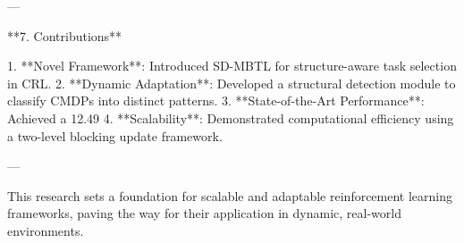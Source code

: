 ---

**7. Contributions**

1. **Novel Framework**: Introduced SD-MBTL for structure-aware task selection in CRL.
2. **Dynamic Adaptation**: Developed a structural detection module to classify CMDPs into distinct patterns.
3. **State-of-the-Art Performance**: Achieved a 12.49%
4. **Scalability**: Demonstrated computational efficiency using a two-level blocking update framework.

--- 

This research sets a foundation for scalable and adaptable reinforcement learning frameworks, paving the way for their application in dynamic, real-world environments.